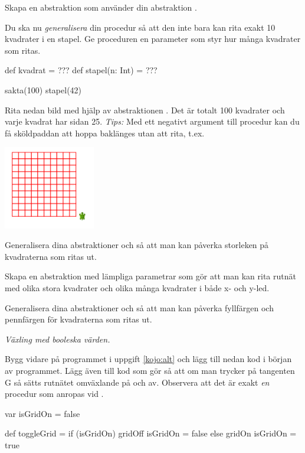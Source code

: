 \Subtask Skapa en abstraktion  som använder din abstraktion .

\Subtask Du ska nu \emph{generalisera} din procedur så att den inte bara kan rita exakt 10 kvadrater i en stapel. Ge proceduren  en parameter  som styr hur många kvadrater som ritas.
\begin{Code}
def kvadrat = ???
def stapel(n: Int) = ???

sakta(100)
stapel(42)
\end{Code}



\Subtask Rita nedan bild med hjälp av abstraktionen . Det är totalt 100 kvadrater och varje kvadrat har sidan 25. \emph{Tips:} Med ett negativt argument till procedur  kan du få sköldpaddan att hoppa baklänges utan att rita, t.ex. 

\includegraphics[width=0.3\textwidth]{../img/kojo/square-grid}

\Subtask Generalisera dina abstraktioner  och  så att man kan påverka storleken på kvadraterna som ritas ut.

\Subtask Skapa en abstraktion  med lämpliga parametrar som gör att man kan rita rutnät med olika stora kvadrater och olika många kvadrater i både x- och y-led.

\Subtask Generalisera dina abstraktioner  och  så att man kan påverka fyllfärgen och pennfärgen för kvadraterna som ritas ut.

\Task \emph{Växling med booleska värden.}

\Subtask Bygg vidare på programmet i uppgift \ref{kojo:alt} och lägg till nedan kod i början av programmet. Lägg även till kod som gör så att om man trycker på tangenten G så sätts rutnätet omväxlande på och av. Observera att det är exakt \emph{en} procedur som anropas vid .

\begin{Code}
var isGridOn = false

def toggleGrid =
  if (isGridOn) {
    gridOff
    isGridOn = false
  } else {
    gridOn
    isGridOn = true
  }
\end{Code}

